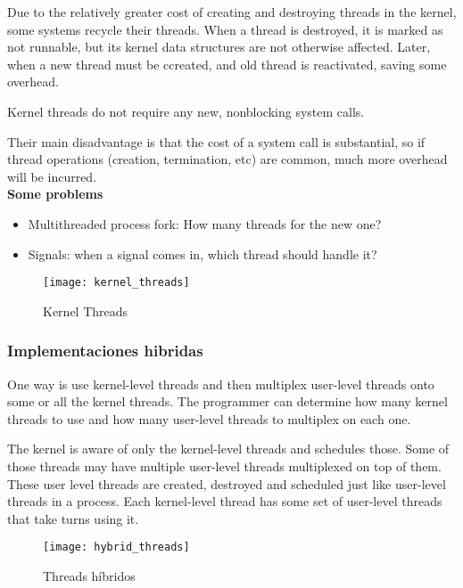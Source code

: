 \documentclass[a4paper, twoside]{article}
\begin{document}
Due to the relatively greater cost of creating and destroying threads in the
kernel, some systems recycle their threads.
When a thread is destroyed, it is marked as not runnable, but its kernel
data structures are not otherwise affected.
Later, when a new thread must be ccreated, and old thread is reactivated,
saving some overhead.

Kernel threads do not require any new, nonblocking system calls.

Their main disadvantage is that the cost of a system call is substantial,
so if thread operations (creation, termination, etc) are common, much more
overhead will be incurred.\\

\textbf{Some problems}
\begin{itemize}
  \item Multithreaded process fork: How many threads for the new one?
  \item Signals: when a signal comes in, which thread should handle it?
\end{itemize}

\begin{figure}[h]
  \centering
  \texttt{[image: kernel\_threads]}
  \caption{Kernel Threads}
  \label{fig:kernel_threads}
\end{figure}

\subsubsection{Implementaciones hibridas}

One way is use kernel-level threads and then multiplex user-level threads
onto some or all the kernel threads.
The programmer can determine how many kernel threads to use and how many
user-level threads to multiplex on each one.

The kernel is aware of only the kernel-level threads and schedules those.
Some of those threads may have multiple user-level threads multiplexed on
top of them.
These user level threads are created, destroyed and scheduled just like
user-level threads in a process.
Each kernel-level thread has some set of user-level threads that take turns
using it.\\

\begin{figure}[h]
  \centering
  \texttt{[image: hybrid\_threads]}
  \caption{Threads híbridos}
  \label{fig:hybrid_threads}
\end{figure}
\end{document}
